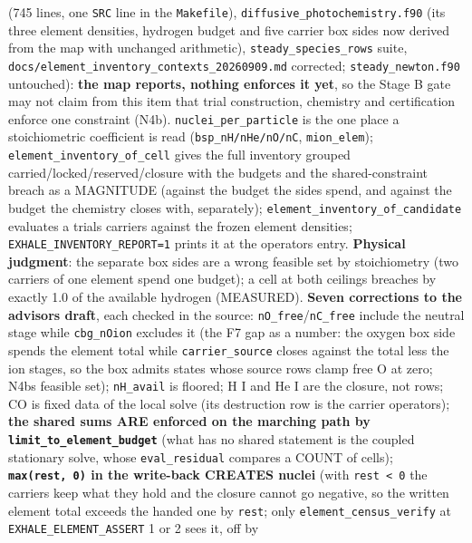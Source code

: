 \documentclass[english,a4paper]{my_memo}
\begin{document}
\begin{itemize}
  (745 lines, one \texttt{SRC} line in the \texttt{Makefile}), \texttt{diffusive\_photochemistry.f90}
  (its three element densities, hydrogen budget and five carrier box sides
  now derived from the map with unchanged arithmetic), \texttt{steady\_species\_rows}
  suite, \texttt{docs/element\_inventory\_contexts\_20260909.md} corrected;
  \texttt{steady\_newton.f90} untouched): \textbf{the map reports, nothing enforces it
  yet}, so the Stage B gate may not claim from this item that trial
  construction, chemistry and certification enforce one constraint (N4b).
  \texttt{nuclei\_per\_particle} is the one place a stoichiometric coefficient is
  read (\texttt{bsp\_nH/nHe/nO/nC}, \texttt{mion\_elem}); \texttt{element\_inventory\_of\_cell} gives
  the full inventory grouped carried/locked/reserved/closure with the
  budgets and the shared-constraint breach as a MAGNITUDE (against the
  budget the sides spend, and against the budget the chemistry closes
  with, separately); \texttt{element\_inventory\_of\_candidate} evaluates a trial\textquotesingle s
  carriers against the frozen element densities; \texttt{EXHALE\_INVENTORY\_REPORT=1}
  prints it at the operator\textquotesingle s entry. \textbf{Physical judgment}: the separate box
  sides are a wrong feasible set by stoichiometry (two carriers of one
  element spend one budget); a cell at both ceilings breaches by exactly
  1.0 of the available hydrogen (MEASURED). \textbf{Seven corrections to the
  advisor\textquotesingle s draft}, each checked in the source: \texttt{nO\_free}/\texttt{nC\_free}
  include the neutral stage while \texttt{cbg\_nOion} excludes it (the F7 gap as a
  number: the oxygen box side spends the element total while
  \texttt{carrier\_source} closes against the total less the ion stages, so the
  box admits states whose source rows clamp free O at zero; N4b\textquotesingle s feasible
  set); \texttt{nH\_avail} is floored; H I and He I are the closure, not rows; CO
  is fixed data of the local solve (its destruction row is the carrier
  operator\textquotesingle s); \textbf{the shared sums ARE enforced on the marching path by
  \texttt{limit\_to\_element\_budget}} (what has no shared statement is the coupled
  stationary solve, whose \texttt{eval\_residual} compares a COUNT of cells);
  \textbf{\texttt{max(rest,\ 0)} in the write-back CREATES nuclei} (with \texttt{rest\ \textless{}\ 0} the
  carriers keep what they hold and the closure cannot go negative, so the
  written element total exceeds the handed one by \texttt{\textbar{}rest\textbar{}}; only
  \texttt{element\_census\_verify} at \texttt{EXHALE\_ELEMENT\_ASSERT} 1 or 2 sees it, off by

\end{itemize}
\end{document}
